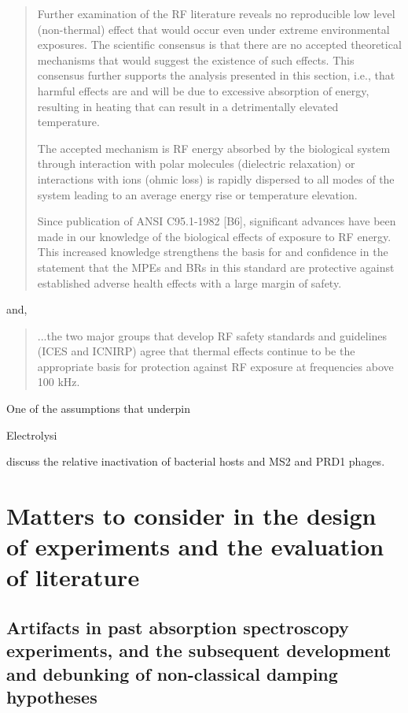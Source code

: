 \documentclass[paper.tex]{subfiles}
\begin{document}
\begin{multicols}{1}
\begin{quote}
	Further examination of the RF literature reveals no reproducible low level (non-thermal) effect that would
	occur even under extreme environmental exposures. The scientific consensus is that there are no accepted
	theoretical mechanisms that would suggest the existence of such effects. This consensus further supports the
	analysis presented in this section, i.e., that harmful effects are and will be due to excessive absorption of
	energy, resulting in heating that can result in a detrimentally elevated temperature. 
	
	The accepted mechanism is RF energy absorbed by the biological system through interaction with polar molecules (dielectric relaxation) or interactions with ions (ohmic loss) is rapidly dispersed to all modes of the system leading to an average energy rise or temperature elevation. 
	
	Since publication of ANSI C95.1-1982 [B6], significant advances have been made in our knowledge of the biological effects of exposure to RF energy. This increased knowledge strengthens the basis for and confidence in the statement that the MPEs and BRs in this	standard are protective against established adverse health effects with a large margin of safety.
\end{quote}

and, 

\begin{quote}
	...the two major groups that develop RF safety standards and
	guidelines (ICES and ICNIRP) agree that thermal effects continue to be the appropriate basis for protection
	against RF exposure at frequencies above 100 kHz.
\end{quote}



One of the assumptions that underpin 



Electrolysi

\cite{comparative2003} discuss the relative inactivation of bacterial hosts and MS2 and PRD1 phages. 

\section{Matters to consider in the design of experiments and the evaluation of literature}

\subsection{Artifacts in past absorption spectroscopy experiments, and the subsequent development and debunking of non-classical damping hypotheses}


\end{multicols}
\end{document}
